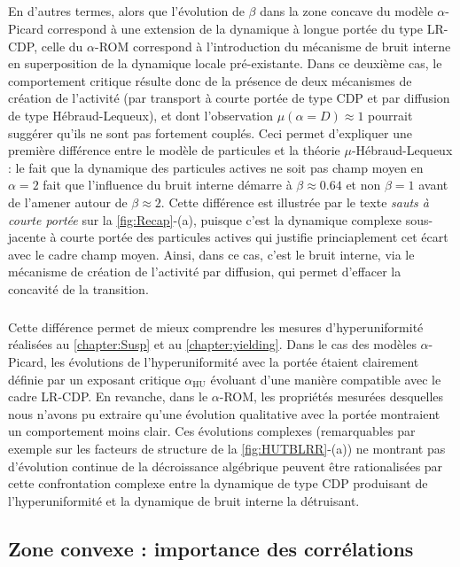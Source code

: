 \subparagraph{}En d'autres termes, alors que l'évolution de $\beta$ dans la zone concave du modèle $\alpha$-Picard correspond à une extension de la dynamique à longue portée du type LR-CDP, celle du $\alpha$-ROM correspond à l'introduction du mécanisme de bruit interne en superposition de la dynamique locale pré-existante. Dans ce deuxième cas, le comportement critique résulte donc de la présence de deux mécanismes de création de l'activité (par transport à courte portée de type CDP et par diffusion de type Hébraud-Lequeux), et dont l'observation $\mu(\alpha = D) \approx 1$ pourrait suggérer qu'ils ne sont pas fortement couplés. Ceci permet d'expliquer une première différence entre le modèle de particules et la théorie $\mu$-Hébraud-Lequeux : le fait que la dynamique des particules actives ne soit pas champ moyen en $\alpha = 2$ fait que l'influence du bruit interne démarre à $\beta \approx 0.64$ et non $\beta = 1$ avant de l'amener autour de $\beta \approx 2$. Cette différence est illustrée par le texte \textit{sauts à courte portée} sur la \autoref{fig:Recap}-(a), puisque c'est la dynamique complexe sous-jacente à courte portée des particules actives qui justifie princiaplement cet écart avec le cadre champ moyen. Ainsi, dans ce cas, c'est le bruit interne, via le mécanisme de création de l'activité par diffusion, qui permet d'effacer la concavité de la transition.

\subparagraph{}Cette différence permet de mieux comprendre les mesures d'hyperuniformité réalisées au \autoref{chapter:Susp} et au \autoref{chapter:yielding}. Dans le cas des modèles $\alpha$-Picard, les évolutions de l'hyperuniformité avec la portée étaient clairement définie par un exposant critique $\alpha_\text{HU}$ évoluant d'une manière compatible avec le cadre LR-CDP. En revanche, dans le $\alpha$-ROM, les propriétés mesurées desquelles nous n'avons pu extraire qu'une évolution qualitative avec la portée montraient un comportement moins clair. Ces évolutions complexes (remarquables par exemple sur les facteurs de structure de la \autoref{fig:HUTBLRR}-(a)) ne montrant pas d'évolution continue de la décroissance algébrique peuvent être rationalisées par cette confrontation complexe entre la dynamique de type CDP produisant de l'hyperuniformité et la dynamique de bruit interne la détruisant.

\FloatBarrier

\subsection{Zone convexe : importance des corrélations}


